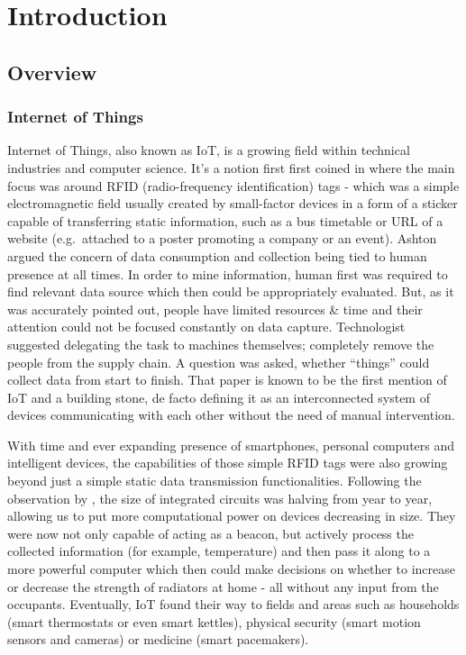 \chapter{Introduction\label{chap:introduction}}

\section{Overview}
\subsection{Internet of Things}
Internet of Things, also known as IoT, is a growing field within technical industries and computer science. It's a notion first first coined in \citet{ashton1999introduction} where the main focus was around RFID (radio-frequency identification) tags - which was a simple electromagnetic field usually created by small-factor devices in a form of a sticker capable of transferring static information, such as a bus timetable or URL of a website (e.g.\ attached to a poster promoting a company or an event). Ashton argued the concern of data consumption and collection being tied to human presence at all times. In order to mine information, human first was required to find relevant data source which then could be appropriately evaluated. But, as it was accurately pointed out, people have limited resources \& time and their attention could not be focused constantly on data capture. Technologist suggested delegating the task to machines themselves; completely remove the people from the supply chain. A question was asked, whether ``things'' could collect data from start to finish. That paper is known to be the first mention of IoT and a building stone, de facto defining it as an interconnected system of devices communicating with each other without the need of manual intervention.

With time and ever expanding presence of smartphones, personal computers and intelligent devices, the capabilities of those simple RFID tags were also growing beyond just a simple static data transmission functionalities. Following the observation by \citeauthor{moore1965cramming}, the size of integrated circuits was halving from year to year, allowing us to put more computational power on devices decreasing in size. They were now not only capable of acting as a beacon, but actively process the collected information (for example, temperature) and then pass it along to a more powerful computer which then could make decisions on whether to increase or decrease the strength of radiators at home - all without any input from the occupants. Eventually, IoT found their way to fields and areas such as households (smart thermostats or even smart kettles), physical security (smart motion sensors and cameras) or medicine (smart pacemakers).

